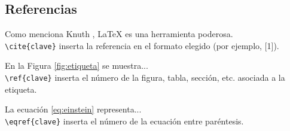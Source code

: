 
\subsection{Referencias}


Como menciona Knuth \cite{knuth1984}, LaTeX es una herramienta poderosa. \\
\texttt{\textbackslash cite\{clave\}} inserta la referencia en el formato elegido (por ejemplo, [1]).

En la Figura \ref{fig:etiqueta} se muestra...\\
\texttt{\textbackslash ref\{clave\}} inserta el número de la figura, tabla, sección, etc. asociada a la etiqueta.

La ecuación \eqref{eq:einstein} representa... \\
\texttt{\textbackslash eqref\{clave\}} inserta el número de la ecuación entre paréntesis.

